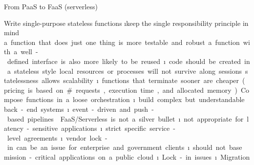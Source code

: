 \begin{frame}[allowframebreaks]{From PaaS to FaaS (serverless)}
\framebreak

Write single-purpose stateless functions
\i keep the single responsibility principle in mind
\si a function that does just one thing is more testable and robust
\si a function with a well-defined interface is also more likely to be reused
\i code should be created in a stateless style
\si local resources or processes will not survive along sessions
\si statelessness allows scalability
\i functions that terminate sooner are cheaper 
\si (pricing is based on \#requests, execution time, and allocated memory)

Compose functions in a loose orchestration
\i build complex but understandable back-end systems
\i event-driven and push-based pipelines

\framebreak

FaaS/Serverless is not a silver bullet
\i not appropriate for latency-sensitive applications 
\i strict specific service-level agreements
\i vendor lock-in can be an issue for enterprise and government clients
\i should not base mission-critical applications on a public cloud
\i Lock-in issues
\i Migration


\end{frame}


